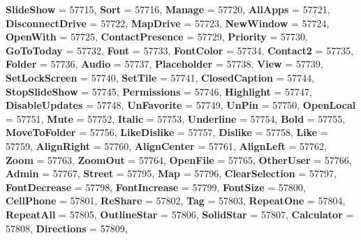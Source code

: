 \begin{DoxyCompactItemize}
{\bfseries Slide\+Show} = 57715, 
{\bfseries Sort} = 57716, 
{\bfseries Manage} = 57720, 
{\bfseries All\+Apps} = 57721, 
\newline
{\bfseries Disconnect\+Drive} = 57722, 
{\bfseries Map\+Drive} = 57723, 
{\bfseries New\+Window} = 57724, 
{\bfseries Open\+With} = 57725, 
\newline
{\bfseries Contact\+Presence} = 57729, 
{\bfseries Priority} = 57730, 
{\bfseries Go\+To\+Today} = 57732, 
{\bfseries Font} = 57733, 
\newline
{\bfseries Font\+Color} = 57734, 
{\bfseries Contact2} = 57735, 
{\bfseries Folder} = 57736, 
{\bfseries Audio} = 57737, 
\newline
{\bfseries Placeholder} = 57738, 
{\bfseries View} = 57739, 
{\bfseries Set\+Lock\+Screen} = 57740, 
{\bfseries Set\+Tile} = 57741, 
\newline
{\bfseries Closed\+Caption} = 57744, 
{\bfseries Stop\+Slide\+Show} = 57745, 
{\bfseries Permissions} = 57746, 
{\bfseries Highlight} = 57747, 
\newline
{\bfseries Disable\+Updates} = 57748, 
{\bfseries Un\+Favorite} = 57749, 
{\bfseries Un\+Pin} = 57750, 
{\bfseries Open\+Local} = 57751, 
\newline
{\bfseries Mute} = 57752, 
{\bfseries Italic} = 57753, 
{\bfseries Underline} = 57754, 
{\bfseries Bold} = 57755, 
\newline
{\bfseries Move\+To\+Folder} = 57756, 
{\bfseries Like\+Dislike} = 57757, 
{\bfseries Dislike} = 57758, 
{\bfseries Like} = 57759, 
\newline
{\bfseries Align\+Right} = 57760, 
{\bfseries Align\+Center} = 57761, 
{\bfseries Align\+Left} = 57762, 
{\bfseries Zoom} = 57763, 
\newline
{\bfseries Zoom\+Out} = 57764, 
{\bfseries Open\+File} = 57765, 
{\bfseries Other\+User} = 57766, 
{\bfseries Admin} = 57767, 
\newline
{\bfseries Street} = 57795, 
{\bfseries Map} = 57796, 
{\bfseries Clear\+Selection} = 57797, 
{\bfseries Font\+Decrease} = 57798, 
\newline
{\bfseries Font\+Increase} = 57799, 
{\bfseries Font\+Size} = 57800, 
{\bfseries Cell\+Phone} = 57801, 
{\bfseries Re\+Share} = 57802, 
\newline
{\bfseries Tag} = 57803, 
{\bfseries Repeat\+One} = 57804, 
{\bfseries Repeat\+All} = 57805, 
{\bfseries Outline\+Star} = 57806, 
\newline
{\bfseries Solid\+Star} = 57807, 
{\bfseries Calculator} = 57808, 
{\bfseries Directions} = 57809, 

\end{DoxyCompactItemize}
